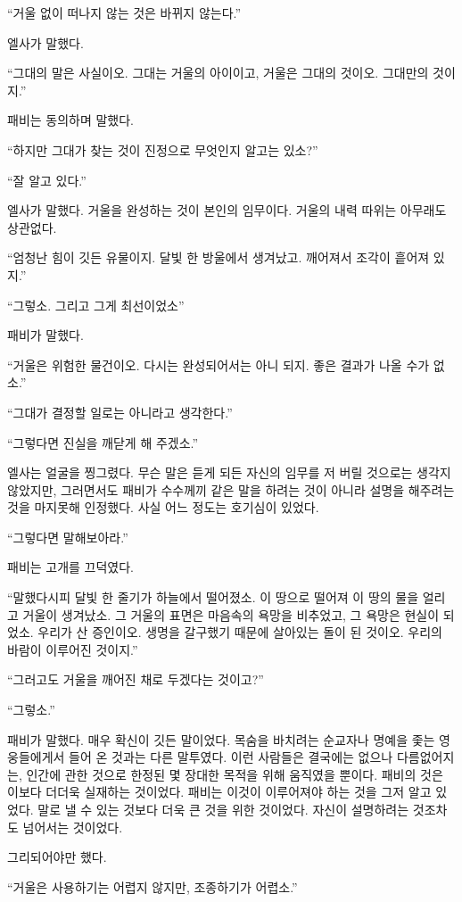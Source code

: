 ``거울 없이 떠나지 않는 것은 바뀌지 않는다.''

엘사가 말했다.

``그대의 말은 사실이오. 그대는 거울의 아이이고, 거울은 그대의 것이오. 그대만의 것이지.''

패비는 동의하며 말했다.

``하지만 그대가 찾는 것이 진정으로 무엇인지 알고는 있소?''

``잘 알고 있다.''

엘사가 말했다. 거울을 완성하는 것이 본인의 임무이다. 거울의 내력 따위는 아무래도 상관없다.

``엄청난 힘이 깃든 유물이지. 달빛 한 방울에서 생겨났고. 깨어져서 조각이 흩어져 있지.''

``그렇소. 그리고 그게 최선이었소''

패비가 말했다.

``거울은 위험한 물건이오. 다시는 완성되어서는 아니 되지. 좋은 결과가 나올 수가 없소.''

``그대가 결정할 일로는 아니라고 생각한다.''

``그렇다면 진실을 깨닫게 해 주겠소.''

엘사는 얼굴을 찡그렸다. 무슨 말은 듣게 되든 자신의 임무를 저 버릴 것으로는 생각지 않았지만, 그러면서도 패비가 수수께끼 같은 말을 하려는 것이 아니라 설명을 해주려는 것을 마지못해 인정했다. 사실 어느 정도는 호기심이 있었다.

``그렇다면 말해보아라.''

패비는 고개를 끄덕였다.

``말했다시피 달빛 한 줄기가 하늘에서 떨어졌소. 이 땅으로 떨어져 이 땅의 물을 얼리고 거울이 생겨났소. 그 거울의 표면은 마음속의 욕망을 비추었고, 그 욕망은 현실이 되었소. 우리가 산 증인이오. 생명을 갈구했기 때문에 살아있는 돌이 된 것이오. 우리의 바람이 이루어진 것이지.''

``그러고도 거울을 깨어진 채로 두겠다는 것이고?''

``그렇소.''

패비가 말했다. 매우 확신이 깃든 말이었다. 목숨을 바치려는 순교자나 명예을 좇는 영웅들에게서 들어 온 것과는 다른 말투였다. 이런 사람들은 결국에는 없으나 다름없어지는, 인간에 관한 것으로 한정된 몇 장대한 목적을 위해 움직였을 뿐이다. 패비의 것은 이보다 더더욱 실재하는 것이었다. 패비는 이것이 이루어져야 하는 것을 그저 알고 있었다. 말로 낼 수 있는 것보다 더욱 큰 것을 위한 것이었다. 자신이 설명하려는 것조차도 넘어서는 것이었다.

그리되어야만 했다.

``거울은 사용하기는 어렵지 않지만, 조종하기가 어렵소.''

